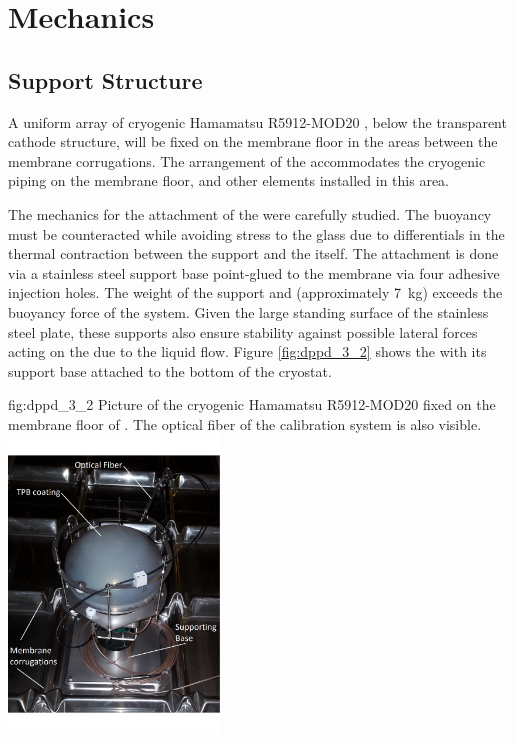 \section{Mechanics}
\label{sec:dp-pds-mechanics}

\subsection{ Support Structure}
\label{subsec:dp-pds-mechanics-pmtsupport}

A uniform array of \dpnumpmtch cryogenic Hamamatsu R5912-MOD20 , below the transparent cathode structure, will be fixed on the membrane floor in the areas between the membrane corrugations. The arrangement of the  accommodates the cryogenic piping on the membrane floor, and other elements installed in this area.

The mechanics for the attachment of the  were carefully studied. The  buoyancy must be counteracted while avoiding stress to the  glass due to differentials in the thermal contraction between the support and the  itself. The attachment is done via a stainless steel support base point-glued to the membrane via four adhesive injection holes. The weight of the support and  (approximately \SI{7}{\kg}) exceeds the buoyancy force of the system. Given the large standing surface of the stainless steel plate, these supports also ensure stability against possible lateral forces acting on the  due to the liquid flow. Figure \ref{fig:dppd_3_2} shows the  with its support base attached to the bottom of the  cryostat.

\begin{dunefigure}{fig:dppd_3_2}
{Picture of the cryogenic Hamamatsu R5912-MOD20  fixed on the membrane floor of . The optical fiber of the calibration system is also visible.}
\includegraphics[width=0.42\textwidth]{graphics/dppd_3_n2}
\end{dunefigure}

